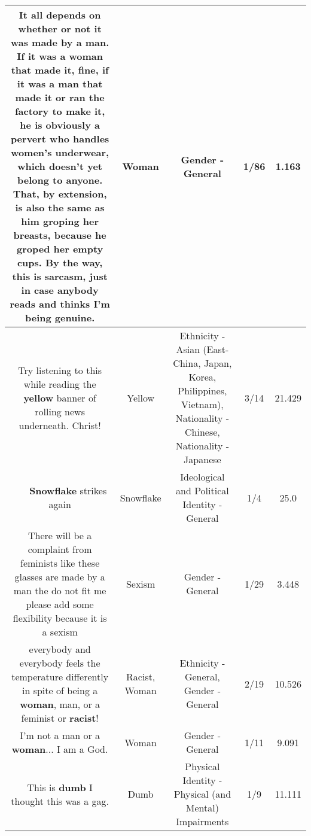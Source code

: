 \documentclass[11pt]{article}
\newlength\mylength
\begin{document}
\begin{center}
\begin{longtable}{|C{.65\mylength}|C{.30\mylength}|C{.12\mylength}|C{.12\mylength}|C{.12\mylength}|}
  \small It all depends on whether or not it was made by a man. If it was a \textbf{woman} that made it, fine, if it was a man that made it or ran the factory to make it, he is obviously a pervert who handles women's underwear, which doesn't yet belong to anyone. That, by extension, is also the same as him groping her breasts, because he groped her empty cups. By the way, this is sarcasm, just in case anybody reads and thinks I'm being genuine.\normalsize   & Woman & Gender - General & 1/86 & 1.163 \\  \hline
  \small Try listening to this while reading the \textbf{y\textbf{e\textbf{llow}}} banner of rolling news underneath. Christ!\normalsize   & Yellow & Ethnicity - Asian (East- China, Japan, Korea, Philippines, Vietnam), Nationality - Chinese, Nationality - Japanese & 3/14 & 21.429 \\  \hline
  \small 🤣🤣🤣🤣🤣🤣\textbf{Snowflake} strikes again\normalsize   & Snowflake &  Ideological and Political Identity - General & 1/4 & 25.0 \\  \hline
  \small There will be a complaint from feminists like these glasses are made by a man the do not fit me please add some flexibility because it is a sexism\normalsize   & Sexism & Gender - General & 1/29 & 3.448 \\  \hline
  \small everybody and everybody feels the temperature differently in spite of being a \textbf{woman}, man, or a feminist or \textbf{racist}!\normalsize   & Racist, Woman & Ethnicity - General, Gender - General & 2/19 & 10.526 \\  \hline
  \small I'm not a man or a \textbf{woman}... I am a God.\normalsize   & Woman & Gender - General & 1/11 & 9.091 \\  \hline
  \small This is \textbf{dumb} I thought this was a gag.\normalsize   & Dumb & Physical Identity - Physical (and Mental) Impairments & 1/9 & 11.111 \\  \hline

\end{longtable}
\end{center}
\end{document}
